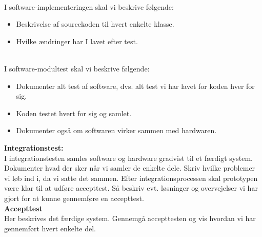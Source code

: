 \documentclass[11pt]{article}
\begin{document}
\\
I software-implementeringen skal vi beskrive følgende:

\begin{itemize}
	\item Beskrivelse af sourcekoden til hvert enkelte klasse.
	\item Hvilke ændringer har I lavet efter test.
\end{itemize}

\\
I software-modultest skal vi beskrive følgende:

\begin{itemize}
	\item Dokumenter alt test af software, dvs. alt test vi har lavet for koden hver for sig.
	\item Koden testet hvert for sig og samlet.
	\item Dokumenter også om softwaren virker sammen med hardwaren.
\end{itemize}

\textbf{Integrationstest:}\\
I integrationstesten samles software og hardware gradvist til et færdigt system. Dokumenter hvad der sker når vi samler de enkelte dele. Skriv hvilke problemer vi løb ind i, da vi satte det sammen. Efter integrationsprocessen skal prototypen være klar til at udføre accepttest. Så beskriv evt. løsninger og overvejelser vi har gjort for at kunne gennemføre en accepttest.\\

\textbf{Accepttest}\\
Her beskrives det færdige system. Gennemgå accepttesten og vis hvordan vi har gennemført hvert enkelte del. 



 
\end{document}
